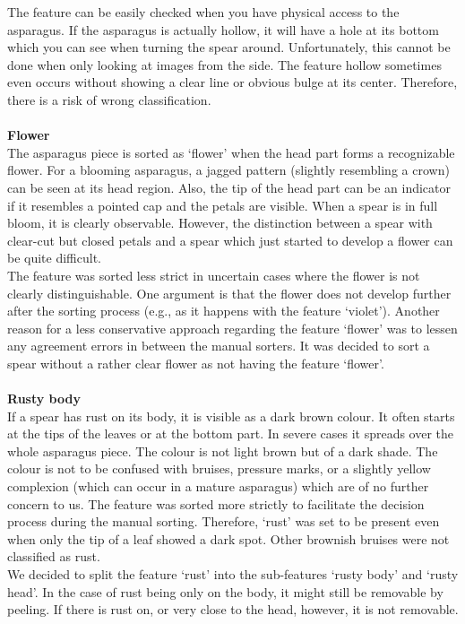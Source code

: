 The feature can be easily checked when you have physical access to the asparagus. If the asparagus is actually hollow, it will have a hole at its bottom which you can see when turning the spear around. Unfortunately, this cannot be done when only looking at images from the side. The feature hollow sometimes even occurs without showing a clear line or obvious bulge at its center. Therefore, there is a risk of wrong classification. \\
 \\
\textbf{Flower} \\
The asparagus piece is sorted as ‘flower’ when the head part forms a recognizable flower.
For a blooming asparagus, a jagged pattern (slightly resembling a crown) can be seen at its head region. Also, the tip of the head part can be an indicator if it resembles a pointed cap and the petals are visible. When a spear is in full bloom, it is clearly observable. However, the distinction between a spear with clear-cut but closed petals and a spear which just started to develop a flower can be quite difficult. \\
The feature was sorted less strict in uncertain cases where the flower is not clearly distinguishable. One argument is that the flower does not develop further after the sorting process (e.g., as it happens with the feature ‘violet’). Another reason for a less conservative approach regarding the feature ‘flower’ was to lessen any agreement errors in between the manual sorters. It was decided to sort a spear without a rather clear flower as not having the feature ‘flower’. \\
 \\
\textbf{Rusty body} \\
If a spear has rust on its body, it is visible as a dark brown colour.
It often starts at the tips of the leaves or at the bottom part. In severe cases it spreads over the whole asparagus piece. The colour is not light brown but of a dark shade. The colour is not to be confused with bruises, pressure marks, or a slightly yellow complexion (which can occur in a mature asparagus) which are of no further concern to us.
The feature was sorted more strictly to facilitate the decision process during the manual sorting. Therefore, ‘rust’ was set to be present even when only the tip of a leaf showed a dark spot. Other brownish bruises were not classified as rust. \\
We decided to split the feature ‘rust’ into the sub-features ‘rusty body’ and ‘rusty head’. In the case of rust being only on the body, it might still be removable by peeling. If there is rust on, or very close to the head, however, it is not removable. \\
